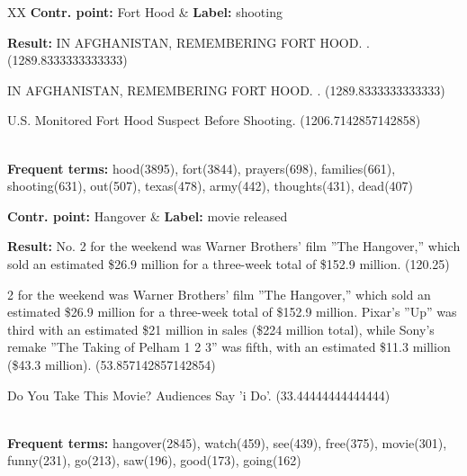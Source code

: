 \begin{table*}[htbp]
\begin{tabularx}{\textwidth}{XX}
\textbf{Contr. point:} Fort Hood & \textbf{Label:} shooting \\
{\textbf{Result:} 
IN AFGHANISTAN, REMEMBERING FORT HOOD. . (1289.8333333333333)

IN AFGHANISTAN, REMEMBERING FORT HOOD. . (1289.8333333333333)

U.S. Monitored Fort Hood Suspect Before Shooting. (1206.7142857142858)
} \\
{\textbf{Frequent terms:} hood(3895), fort(3844), prayers(698), families(661), shooting(631), out(507), texas(478), army(442), thoughts(431), dead(407)}\\
\hline

\textbf{Contr. point:} Hangover & \textbf{Label:} movie released \\
{\textbf{Result:} 
No. 2 for the weekend was Warner Brothers' film ''The Hangover,'' which sold an
estimated \$26.9 million for a three-week total of \$152.9 million. (120.25)

2 for the weekend was Warner Brothers' film ''The Hangover,'' which sold an
estimated \$26.9 million for a three-week total of \$152.9 million. Pixar's
''Up'' was third with an estimated \$21 million in sales (\$224 million total),
while Sony's remake ''The Taking of Pelham 1 2 3'' was fifth, with an estimated
\$11.3 million (\$43.3 million). (53.857142857142854)

Do You Take This Movie? Audiences Say 'i Do'. (33.44444444444444)
} \\
{\textbf{Frequent terms:} 
hangover(2845), watch(459), see(439), free(375), movie(301), funny(231), go(213), saw(196), good(173), going(162)}\\
\hline



\end{tabularx}
\end{table*}
